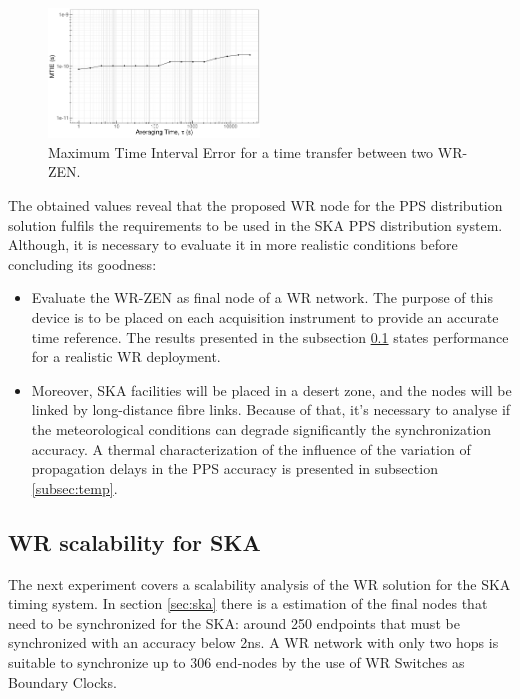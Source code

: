 \begin{figure}
		\centering
		\includegraphics[width=0.5\textwidth]{img/MTIE_exp1}
		\caption[MTIE plot for the WR-ZEN]{Maximum Time Interval Error for a 
		time transfer between two WR-ZEN.}
		\label{fig:mtie_exp1}

\end{figure}

The obtained values reveal that the proposed WR node for the PPS distribution 
solution fulfils the requirements to be used in the SKA PPS distribution 
system. Although, it is necessary to evaluate it in more realistic conditions 
before concluding its goodness:

\begin{itemize}
	\item Evaluate the WR-ZEN as final node of a WR network. The purpose of 
	this device is to be placed on each acquisition instrument to provide an 
	accurate time reference. The results presented in the subsection 
	\ref{subsec: net_exp} states performance for a realistic WR deployment.
	
	\item Moreover, SKA facilities will be placed in a desert zone, and 
	the nodes will be linked by long-distance fibre links. Because of that, 
	it's 
	necessary to analyse if the meteorological conditions can degrade 
	significantly the synchronization accuracy. A thermal characterization of 
	the influence of the variation of propagation delays in the PPS accuracy is 
	presented in subsection \ref{subsec:temp}.
\end{itemize}   

\subsection{WR scalability for SKA} %
\label{subsec: net_exp}

The next experiment covers a scalability analysis of the WR solution for the 
SKA timing system. In section \ref{sec:ska} there is a estimation of the final 
nodes that need to be synchronized for the SKA: around 250 endpoints that 
must be synchronized with an accuracy below 2ns. A WR network with only two 
hops is suitable to synchronize up to 306 end-nodes by the use of WR Switches as 
Boundary Clocks.

